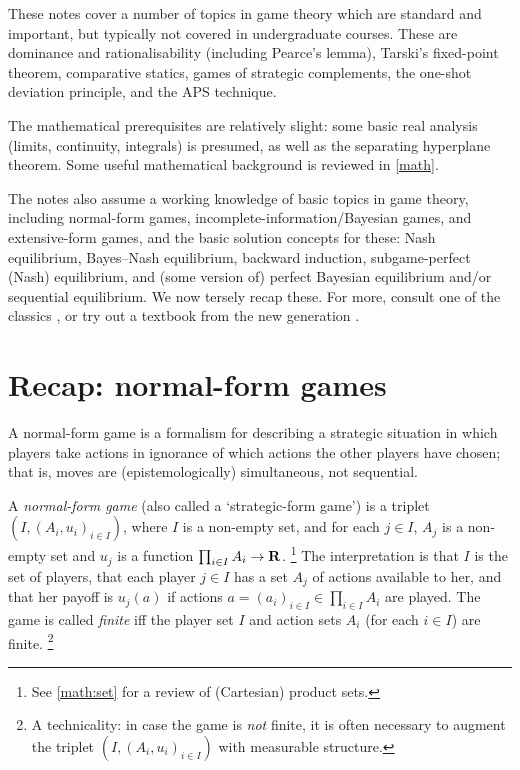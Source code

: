\documentclass[11pt,letterpaper,reqno,oneside]{book}
\begin{document}
These notes cover a number of topics in game theory which are standard and important, but typically not covered in undergraduate courses. These are dominance and rationalisability (including Pearce's lemma), Tarski's fixed-point theorem, comparative statics, games of strategic complements, the one-shot deviation principle, and the APS \parencite{AbreuPearceStacchetti1990} technique.

The mathematical prerequisites are relatively slight: some basic real analysis (limits, continuity, integrals) is presumed, as well as the separating hyperplane theorem. Some useful mathematical background is reviewed in \cref{math}.

The notes also assume a working knowledge of basic topics in game theory, including normal-form games, incomplete-information/Bayesian games, and extensive-form games, and the basic solution concepts for these: Nash equilibrium, Bayes--Nash equilibrium, backward induction, subgame-perfect (Nash) equilibrium, and (some version of) perfect Bayesian equilibrium and/or sequential equilibrium. We now tersely recap these. For more, consult one of the classics \parencite{OsborneRubinstein1994,FudenbergTirole1991book,Myerson1991}, or try out a textbook from the new generation \parencite{MaschlerSolanZamir2020,Kreps2023,BattigalliCatoniniDevito2024}.



\section{Recap: normal-form games}
\label{ch0:normal}

A normal-form game is a formalism for describing a strategic situation in which players take actions in ignorance of which actions the other players have chosen; that is, moves are (epistemologically) simultaneous, not sequential.

A \emph{normal-form game} (also called a `strategic-form game') is a triplet $\left( I, (A_i, u_i)_{i \in I} \right)$, where $I$ is a non-empty set, and for each $j \in I$, $A_j$ is a non-empty set and $u_j$ is a function $\prod_{i \in I} A_i \to \mathbf{R}$.%
	\footnote{See \cref{math:set} for a review of (Cartesian) product sets.}
The interpretation is that $I$ is the set of players, that each player $j \in I$ has a set $A_j$ of actions available to her, and that her payoff is $u_j(a)$ if actions $a=(a_i)_{i \in I} \in \prod_{i \in I} A_i$ are played. The game is called \emph{finite} iff the player set $I$ and action sets $A_i$ (for each $i \in I$) are finite.%
	\footnote{A technicality: in case the game is \emph{not} finite, it is often necessary to augment the triplet $\left( I, (A_i, u_i)_{i \in I} \right)$ with measurable structure.}
\end{document}
